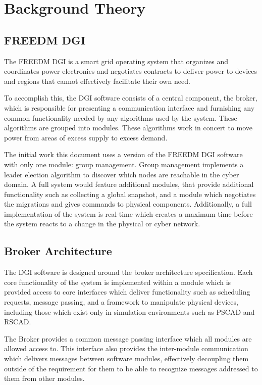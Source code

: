 \chapter{Background Theory}

\section{FREEDM DGI}

The FREEDM DGI is a smart grid operating system that organizes and coordinates power electronics and negotiates contracts to deliver power to devices and regions that cannot effectively facilitate their own need.

To accomplish this, the DGI software consists of a central component, the broker, which is responsible for presenting a communication interface and furnishing any common functionality needed by any algorithms used by the system. These algorithms are grouped into modules. These algorithms work in concert to move power from areas of excess supply to excess demand.

The initial work this document uses a version of the FREEDM DGI software with only one module: group management. Group management implements a leader election algorithm to discover which nodes are reachable in the cyber domain. A full system would feature additional modules, that provide additional functionality such as collecting a global snapshot, and a module which negotiates the migrations and gives commands to physical components. Additionally, a full implementation of the system is real-time which creates a maximum time before the system reacts to a change in the physical or cyber network.

\section{Broker Architecture}

The DGI software is designed around the broker architecture specification. Each core functionality of the system is implemented within a module which is provided access to core interfaces which deliver functionality such as scheduling requests, message passing, and a framework to manipulate physical devices, including those which exist only in simulation environments such as PSCAD\cite{PSCAD} and RSCAD\cite{RSCAD}.

The Broker provides a common message passing interface which all modules are allowed access to. This interface also provides the inter-module communication which delivers messages between software modules, effectively decoupling them outside of the requirement for them to be able to recognize messages addressed to them from other modules.

